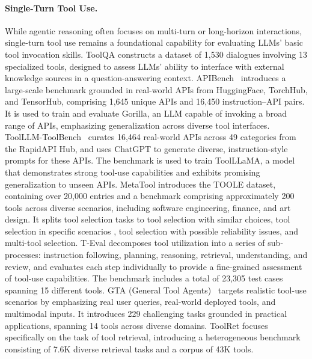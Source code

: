 \paragraph{Single-Turn Tool Use.}
While agentic reasoning often focuses on multi-turn or long-horizon interactions, single-turn tool use remains a foundational capability for evaluating LLMs' basic tool invocation skills. ToolQA \cite{DBLP:conf/nips/ZhuangYWSZ23} constructs a dataset of 1,530 dialogues involving 13 specialized tools, designed to assess LLMs' ability to interface with external knowledge sources in a question-answering context. APIBench~\cite{patil2024gorilla} introduces a large-scale benchmark grounded in real-world APIs from HuggingFace, TorchHub, and TensorHub, comprising 1,645 unique APIs and 16,450 instruction–API pairs. It is used to train and evaluate Gorilla, an LLM capable of invoking a broad range of APIs, emphasizing generalization across diverse tool interfaces. ToolLLM-ToolBench~\cite{DBLP:conf/iclr/QinLYZYLLCTQZHT24} curates 16,464 real-world APIs across 49 categories from the RapidAPI Hub, and uses ChatGPT to generate diverse, instruction-style prompts for these APIs. The benchmark is used to train ToolLLaMA, a model that demonstrates strong tool-use capabilities and exhibits promising generalization to unseen APIs. MetaTool \cite{DBLP:conf/iclr/HuangSLFWZ000G024} introduces the TOOLE dataset, containing over 20,000 entries and a benchmark comprising approximately 200 tools across diverse scenarios, including software engineering, finance, and art design. It splits tool selection tasks to tool selection with similar choices, tool selection in specific scenarios , tool selection with possible reliability issues, and multi-tool selection. T-Eval \cite{DBLP:conf/acl/ChenDZLLZZZLCZ24} decomposes tool utilization into a series of sub-processes: instruction following, planning, reasoning, retrieval, understanding, and review, and evaluates each step individually to provide a fine-grained assessment of tool-use capabilities. The benchmark includes a total of 23,305 test cases spanning 15 different tools. GTA (General Tool Agents)~\cite{jize2024gta} targets realistic tool-use scenarios by emphasizing real user queries, real-world deployed tools, and multimodal inputs. It introduces 229 challenging tasks grounded in practical applications, spanning 14 tools across diverse domains. ToolRet \cite{DBLP:journals/corr/abs-2503-01763} focuses specifically on the task of tool retrieval, introducing a heterogeneous benchmark consisting of 7.6K diverse retrieval tasks and a corpus of 43K tools.


